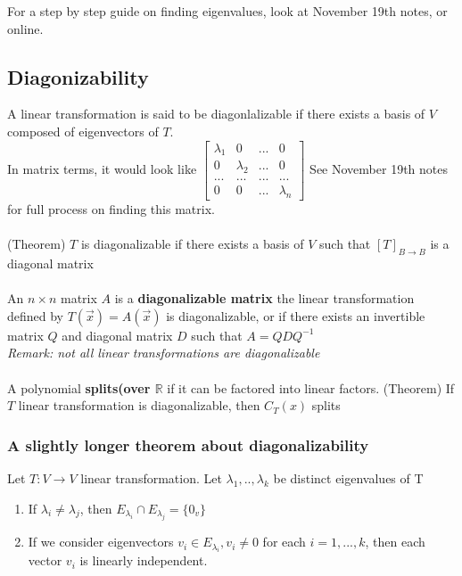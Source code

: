 \documentclass{article}
\begin{document}
For a step by step guide on finding eigenvalues, look at November 19th notes, or online.
\subsection{Diagonizability}
A linear transformation is said to be diagonlalizable if there exists a basis of $V$ composed of eigenvectors of $T$.\\
In matrix terms, it would look like 
$\begin{bmatrix}
\lambda_1&0 &...&0\\
0&\lambda_2&...&0\\
...&...&...&...\\
0&0&...&\lambda_n
\end{bmatrix}$
See November 19th notes for full process on finding this matrix.
\\\\
(Theorem) $T$ is diagonalizable if there exists a basis of $V$ such that $[T]_{B\rightarrow B}$ is a diagonal matrix
\\\\
An $n\times n$ matrix $A$ is a \textbf{diagonalizable matrix} the linear transformation defined by $T(\overrightarrow{x})=A(\overrightarrow{x})$ is diagonalizable, or if there exists an invertible matrix $Q$ and diagonal matrix $D$ such that $A=QDQ^{-1}$\\
\textit{Remark: not all linear transformations are diagonalizable}\\\\
A polynomial \textbf{splits(over $\mathds{R}$} if it can be factored into linear factors.
(Theorem) If $T$ linear transformation is diagonalizable, then $C_T(x)$ splits
\subsubsection{A slightly longer theorem about diagonalizability}
Let $T:V\rightarrow V$ linear transformation. Let $\lambda_1,..,\lambda_k$ be distinct eigenvalues of T
\begin{enumerate}
    \item If $\lambda_i\neq\lambda_j$, then $E_{\lambda_i}\cap E_{\lambda_j}=\{0_v\}$
    \item If we consider eigenvectors $v_i\in E_{\lambda_i},v_i\neq 0$ for each $i=1,...,k$, then each vector $v_i$ is linearly independent.
\end{enumerate}
\end{document}
